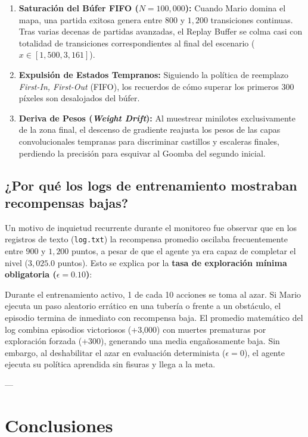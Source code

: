 \documentclass[11pt,letterpaper]{article}
\begin{document}
\begin{enumerate}
    \item \textbf{Saturación del Búfer FIFO ($N = 100,000$):} Cuando Mario domina el mapa, una partida exitosa genera entre $800$ y $1,200$ transiciones continuas. Tras varias decenas de partidas avanzadas, el Replay Buffer se colma casi con totalidad de transiciones correspondientes al final del escenario ($x \in [1,500, 3,161]$). 
    \item \textbf{Expulsión de Estados Tempranos:} Siguiendo la política de reemplazo \textit{First-In, First-Out} (FIFO), los recuerdos de cómo superar los primeros $300$ píxeles son desalojados del búfer.
    \item \textbf{Deriva de Pesos (\textit{Weight Drift}):} Al muestrear minilotes exclusivamente de la zona final, el descenso de gradiente reajusta los pesos de las capas convolucionales tempranas para discriminar castillos y escaleras finales, perdiendo la precisión para esquivar al Goomba del segundo inicial.
\end{enumerate}

\subsection{¿Por qué los logs de entrenamiento mostraban recompensas bajas?}
Un motivo de inquietud recurrente durante el monitoreo fue observar que en los registros de texto (\texttt{log.txt}) la recompensa promedio oscilaba frecuentemente entre $900$ y $1,200$ puntos, a pesar de que el agente ya era capaz de completar el nivel ($3,025.0$ puntos). Esto se explica por la \textbf{tasa de exploración mínima obligatoria ($\epsilon = 0.10$)}:

Durante el entrenamiento activo, 1 de cada 10 acciones se toma al azar. Si Mario ejecuta un paso aleatorio errático en una tubería o frente a un obstáculo, el episodio termina de inmediato con recompensa baja. El promedio matemático del log combina episodios victoriosos (+3,000) con muertes prematuras por exploración forzada (+300), generando una media engañosamente baja. Sin embargo, al deshabilitar el azar en evaluación determinista ($\epsilon = 0$), el agente ejecuta su política aprendida sin fisuras y llega a la meta.

---

\section{Conclusiones}
\end{document}
